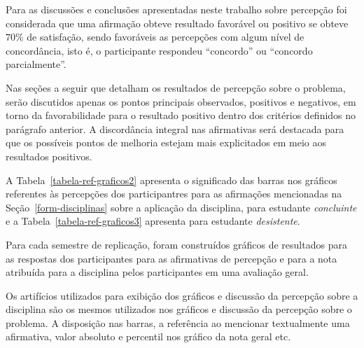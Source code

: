 Para as discussões e conclusões apresentadas neste trabalho
sobre percepção foi considerada que uma afirmação obteve
resultado favorável ou positivo
se obteve $70\%$ de satisfação,
sendo favoráveis as percepções com algum nível de concordância,
isto é, o participante respondeu ``concordo''
ou ``concordo parcialmente''.


Nas seções a seguir que detalham os resultados de percepção sobre o problema, 
serão discutidos apenas os pontos principais observados,
positivos e negativos, em torno da favorabilidade para o
resultado positivo dentro dos critérios
definidos no parágrafo anterior.
A discordância integral nas afirmativas será destacada para que
os possíveis pontos de melhoria estejam mais explicitados em meio
aos resultados positivos.


A Tabela~\ref{tabela-ref-graficos2} apresenta
o significado das barras nos gráficos referentes às percepções
dos participantres para as afirmações mencionadas
na Seção~\ref{form-disciplinas} sobre a aplicação da disciplina,
para estudante \textit{concluinte} e
a Tabela~\ref{tabela-ref-graficos3} apresenta
para estudante \textit{desistente}.




Para cada semestre de replicação, foram construídos gráficos
de resultados para as respostas dos participantes para as afirmativas
de percepção e para a nota atribuída para a disciplina pelos participantes
em uma avaliação geral.

Os artifícios utilizados para exibição dos gráficos e
discussão da percepção sobre a disciplina são os mesmos
utilizados nos gráficos e discussão da percepção sobre
o problema.
A disposição nas barras, a referência ao mencionar textualmente
uma afirmativa, valor absoluto e percentil nos gráfico da
nota geral etc.
















